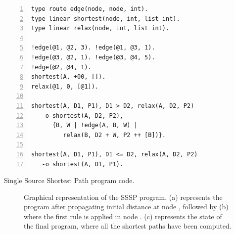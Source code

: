 \begin{topfig}
\scriptsize\begin{Verbatim}[numbers=left]
type route edge(node, node, int).
type linear shortest(node, int, list int).
type linear relax(node, int, list int).

!edge(@1, @2, 3). !edge(@1, @3, 1).
!edge(@3, @2, 1). !edge(@3, @4, 5).
!edge(@2, @4, 1).
shortest(A, +00, []).
relax(@1, 0, [@1]).

shortest(A, D1, P1), D1 > D2, relax(A, D2, P2)
   -o shortest(A, D2, P2),
      {B, W | !edge(A, B, W) |
         relax(B, D2 + W, P2 ++ [B])}.

shortest(A, D1, P1), D1 <= D2, relax(A, D2, P2)
   -o shortest(A, D1, P1).
\end{Verbatim}
\caption{Single Source Shortest Path program code.}
\label{code:shortest_path_program}
\end{topfig}

\begin{figure}[ht]
\begin{center}
  \hspace{0.4cm}
  \hspace{0.4cm}
\end{center}
\caption{Graphical representation of the SSSP program. (a) represents the
   program after propagating initial distance at node , followed by
   (b) where the first rule is applied in node . (c)
   represents the state of the final program, where all the shortest paths
   have been computed.}
\label{fig:shortest_path_program}
\end{figure}

